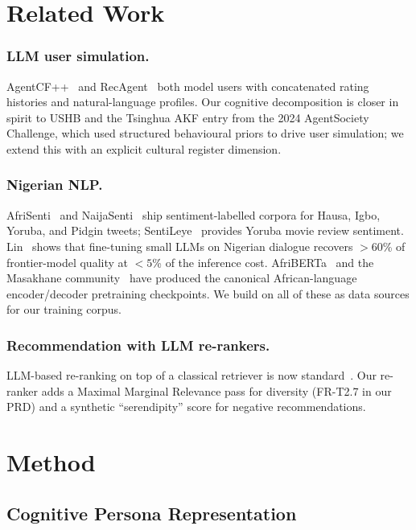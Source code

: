 \documentclass[sigconf,nonacm,balance]{acmart}
\begin{document}
\section{Related Work}

\subsubsection*{LLM user simulation.} AgentCF++~\cite{agentcf} and
RecAgent~\cite{recagent} both model users with concatenated rating histories
and natural-language profiles. Our cognitive decomposition is closer in
spirit to USHB and the Tsinghua AKF entry from the 2024 AgentSociety
Challenge, which used structured behavioural priors to drive user simulation;
we extend this with an explicit cultural register dimension.

\subsubsection*{Nigerian NLP.}  AfriSenti~\cite{afrisenti} and
NaijaSenti~\cite{naijasenti} ship sentiment-labelled corpora for Hausa,
Igbo, Yoruba, and Pidgin tweets; SentiLeye~\cite{sentileye} provides Yoruba
movie review sentiment.  Lin~\cite{lin2024} shows that fine-tuning small
LLMs on Nigerian dialogue recovers \(>\!60\)\% of frontier-model quality at
\(<\!5\)\% of the inference cost. AfriBERTa~\cite{afriberta} and the
Masakhane community~\cite{masakhane} have produced the canonical
African-language encoder/decoder pretraining checkpoints. We build on all of
these as data sources for our training corpus.

\subsubsection*{Recommendation with LLM re-rankers.}  LLM-based re-ranking on
top of a classical retriever is now standard~\cite{recagent}. Our re-ranker
adds a Maximal Marginal Relevance pass for diversity (FR-T2.7 in our PRD) and
a synthetic ``serendipity'' score for negative recommendations.

\section{Method}

\subsection{Cognitive Persona Representation}
\end{document}
